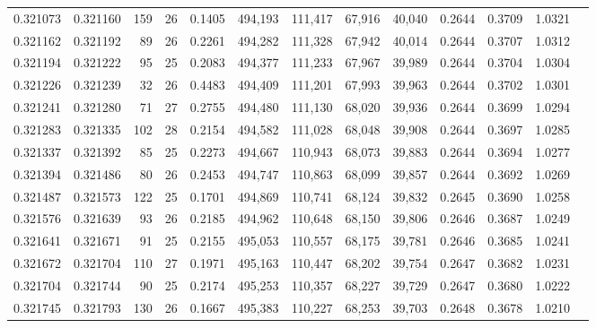 \begin{tabular}{rrrrrrrrrrrrr}
0.321073 & 0.321160 &   159 &  26 &                                     0.1405 & 494,193 & 111,417 &  67,916 &  40,040 & 0.2644 & 0.3709 & 1.0321 \\
0.321162 & 0.321192 &    89 &  26 &                                     0.2261 & 494,282 & 111,328 &  67,942 &  40,014 & 0.2644 & 0.3707 & 1.0312 \\
0.321194 & 0.321222 &    95 &  25 &                                     0.2083 & 494,377 & 111,233 &  67,967 &  39,989 & 0.2644 & 0.3704 & 1.0304 \\
0.321226 & 0.321239 &    32 &  26 &                                     0.4483 & 494,409 & 111,201 &  67,993 &  39,963 & 0.2644 & 0.3702 & 1.0301 \\
0.321241 & 0.321280 &    71 &  27 &                                     0.2755 & 494,480 & 111,130 &  68,020 &  39,936 & 0.2644 & 0.3699 & 1.0294 \\
0.321283 & 0.321335 &   102 &  28 &                                     0.2154 & 494,582 & 111,028 &  68,048 &  39,908 & 0.2644 & 0.3697 & 1.0285 \\
0.321337 & 0.321392 &    85 &  25 &                                     0.2273 & 494,667 & 110,943 &  68,073 &  39,883 & 0.2644 & 0.3694 & 1.0277 \\
0.321394 & 0.321486 &    80 &  26 &                                     0.2453 & 494,747 & 110,863 &  68,099 &  39,857 & 0.2644 & 0.3692 & 1.0269 \\
0.321487 & 0.321573 &   122 &  25 &                                     0.1701 & 494,869 & 110,741 &  68,124 &  39,832 & 0.2645 & 0.3690 & 1.0258 \\
0.321576 & 0.321639 &    93 &  26 &                                     0.2185 & 494,962 & 110,648 &  68,150 &  39,806 & 0.2646 & 0.3687 & 1.0249 \\
0.321641 & 0.321671 &    91 &  25 &                                     0.2155 & 495,053 & 110,557 &  68,175 &  39,781 & 0.2646 & 0.3685 & 1.0241 \\
0.321672 & 0.321704 &   110 &  27 &                                     0.1971 & 495,163 & 110,447 &  68,202 &  39,754 & 0.2647 & 0.3682 & 1.0231 \\
0.321704 & 0.321744 &    90 &  25 &                                     0.2174 & 495,253 & 110,357 &  68,227 &  39,729 & 0.2647 & 0.3680 & 1.0222 \\
0.321745 & 0.321793 &   130 &  26 &                                     0.1667 & 495,383 & 110,227 &  68,253 &  39,703 & 0.2648 & 0.3678 & 1.0210 \\

\end{tabular}
